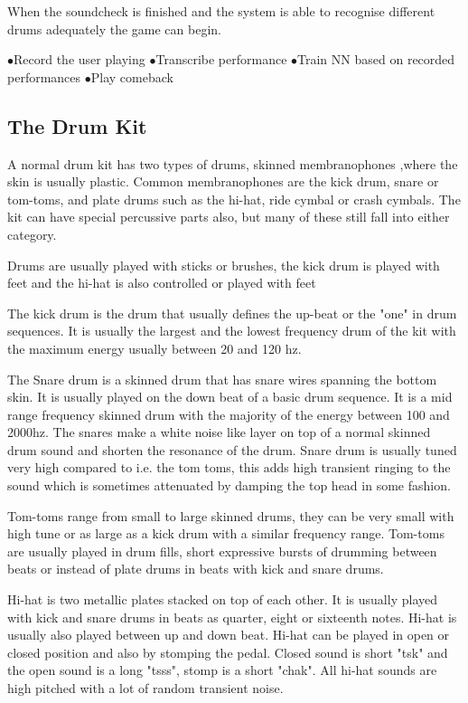 \documentclass[10pt]{article}
\begin{document}
When the soundcheck is finished and the system is able to recognise different drums adequately the game can begin.

$ \bullet $Record the user playing
$ \bullet $Transcribe performance
$ \bullet $Train NN based on recorded performances
$ \bullet $Play comeback


\subsection{The Drum Kit}
A normal drum kit has two types of drums, skinned membranophones ,where the skin is usually plastic. Common membranophones are the kick drum, snare or tom-toms, and plate drums such as the hi-hat, ride cymbal or crash cymbals. The kit can have special percussive parts also, but many of these still fall into either category. 

Drums are usually played with sticks or brushes, the kick drum is played with feet and the hi-hat is also controlled or played with feet

The kick drum is the drum that usually defines the up-beat or the "one" in drum sequences. It is usually the largest and the lowest frequency drum of the kit with the maximum energy usually between 20 and 120 hz.

The Snare drum is a skinned drum that has snare wires spanning the bottom skin. It is usually played on the down beat of a basic drum sequence. It is a mid range frequency skinned drum with the majority of the energy between 100 and 2000hz. The snares make a white noise like layer on top of a normal skinned drum sound and shorten the resonance of the drum. Snare drum is usually tuned very high compared to i.e. the tom toms, this adds high transient ringing to the sound which is sometimes attenuated by damping the top head in some fashion.

Tom-toms range from small to large skinned drums, they can be very small with high tune or as large as a kick drum with a similar frequency range. Tom-toms are usually played in drum fills, short expressive bursts of drumming between beats or instead of plate drums in beats with kick and snare drums.

Hi-hat is two metallic plates stacked on top of each other. It is usually played with kick and snare drums in beats as quarter, eight or sixteenth notes. Hi-hat is usually also played between up and down beat. Hi-hat can be played in open or closed position and also by stomping the pedal. Closed sound is short "tsk" and the open sound is a long "tsss", stomp is a short "chak". All hi-hat sounds are high pitched with a lot of random transient noise.
\end{document}
